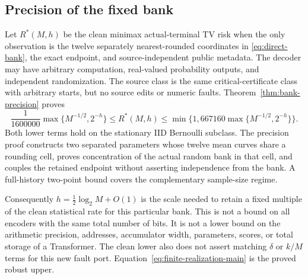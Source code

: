 \subsection{Precision of the fixed bank}
Let $R^*(M,h)$ be the clean minimax actual-terminal TV risk when the only observation is the twelve separately nearest-rounded coordinates in \eqref{eq:direct-bank}, the exact endpoint, and source-independent public metadata. The decoder may have arbitrary computation, real-valued probability outputs, and independent randomization. The source class is the same critical-certificate class with arbitrary starts, but no source edits or numeric faults. Theorem~\ref{thm:bank-precision} proves
\begin{equation}\label{eq:bank-precision-main}
 \frac{1}{1600000}\max\{M^{-1/2},2^{-h}\}
 \le R^*(M,h)
 \le\min\{1,667160\max\{M^{-1/2},2^{-h}\}\}.
\end{equation}
Both lower terms hold on the stationary IID Bernoulli subclass. The precision proof constructs two separated parameters whose twelve mean curves share a rounding cell, proves concentration of the actual random bank in that cell, and couples the retained endpoint without asserting independence from the bank. A full-history two-point bound covers the complementary sample-size regime.

Consequently $h=\tfrac12\log_2 M+O(1)$ is the scale needed to retain a fixed multiple of the clean statistical rate for this particular bank. This is not a bound on all encoders with the same total number of bits. It is not a lower bound on the arithmetic precision, addresses, accumulator width, parameters, scores, or total storage of a Transformer. The clean lower also does not assert matching $\delta$ or $k/M$ terms for this new fault port. Equation~\eqref{eq:finite-realization-main} is the proved robust upper.
